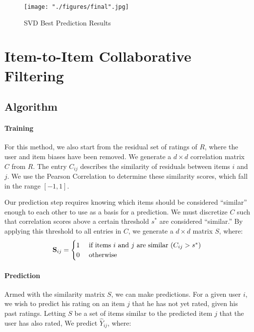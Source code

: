 \documentclass[12pt]{article}
\begin{document}
\begin{figure}[!ht]
\begin{center}
\caption{SVD Best Prediction Results}
\label{fig:svd_results}
    \texttt{[image: "./figures/final".jpg]}
\end{center}
\end{figure}

\section{Item-to-Item Collaborative Filtering}

\subsection*{Algorithm}
\paragraph{Training} For this method, we also start from the residual set of ratings of $R$, where the user and item biases have been removed. We generate a $d \times d$ correlation matrix $C$ from $R$. The entry ${C}_{ij}$ describes the similarity of residuals between items $i$ and $j$. We use the Pearson Correlation to determine these similarity scores, which fall in the range $[-1, 1]$.


Our prediction step requires knowing which items should be considered ``similar'' enough to each other to use as a basis for a prediction. We must discretize ${C}$ such that correlation scores above a certain threshold $s^*$ are considered ``similar.''\textsuperscript{\cite{sarwar}} By applying this threshold to all entries in ${C}$, we generate a $d \times d$ matrix ${S}$, where:
$$
\mathbf{S}_{ij} =
\begin{cases}
    \hfill 1    \hfill & \text{ if items $i$ and $j$ are similar ($C_{ij} > s^*$)} \\
    \hfill 0    \hfill & \text{ otherwise} \\
\end{cases}
$$

\paragraph{Prediction} Armed with the similarity matrix ${S}$, we can make predictions. For a given user $i$, we wish to predict his rating on an item $j$ that he has not yet rated, given his past ratings. Letting $S$ be a set of items similar to the predicted item $j$ that the user has also rated, We predict $\hat Y_{ij}$, where:
\end{document}
